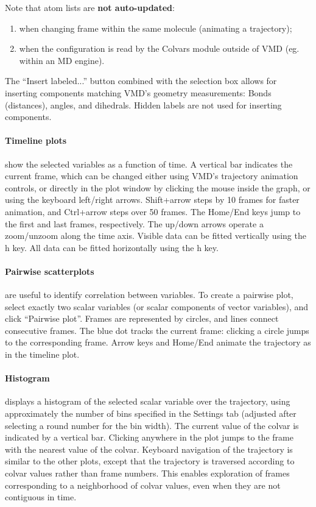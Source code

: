 {Note that atom lists are \textbf{not auto-updated}:
\begin{enumerate}
  \item when changing frame within the same molecule (animating a trajectory);
  \item when the configuration is read by the Colvars module outside of VMD (eg. within an MD engine).
\end{enumerate}

The ``Insert labeled...'' button combined with the selection box allows for inserting components matching VMD's geometry measurements: Bonds (distances), angles, and dihedrals.
Hidden labels are not used for inserting components.


\paragraph{Timeline plots} show the selected variables as a function of time. A vertical bar indicates the current frame, which can be changed either using VMD's trajectory animation controls, or directly in the plot window by clicking the mouse inside the graph, or using the keyboard left/right arrows.
Shift+arrow steps by 10 frames for faster animation, and Ctrl+arrow steps over 50 frames.
The Home/End keys jump to the first and last frames, respectively.
The up/down arrows operate a zoom/unzoom along the time axis.
Visible data can be fitted vertically using the h key. All data can be fitted horizontally using the h key.

\paragraph{Pairwise scatterplots} are useful to identify correlation between variables. To create a pairwise plot, select exactly two scalar variables (or scalar components of vector variables), and click ``Pairwise plot''.
Frames are represented by circles, and lines connect consecutive frames.
The blue dot tracks the current frame: clicking a circle jumps to the corresponding frame.
Arrow keys and Home/End animate the trajectory as in the timeline plot.

\paragraph{Histogram} displays a histogram of the selected scalar variable over the trajectory, using approximately the number of bins specified in the Settings tab (adjusted after selecting a round number for the bin width).
The current value of the colvar is indicated by a vertical bar.
Clicking anywhere in the plot jumps to the frame with the nearest value of the colvar.
Keyboard navigation of the trajectory is similar to the other plots, except that the trajectory is traversed according to colvar values rather than frame numbers.
This enables exploration of frames corresponding to a neighborhood of colvar values, even when they are not contiguous in time.


}
